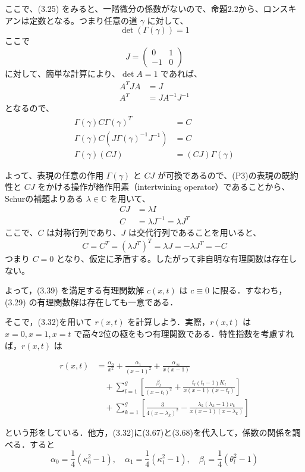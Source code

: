 \documentclass[paper=a4, fontsize=11pt]{jlreq} %
\newenvironment{story}{%
  \begin{mdframed}[
    backgroundcolor=red!5, %
    linewidth=0pt,         %
    innertopmargin=10pt,   %
    innerbottommargin=10pt,
    innerrightmargin=10pt, %
    innerleftmargin=10pt
  ]%
}{%
  \end{mdframed}%
}
\theoremstyle{break}
\theoremstyle{qa}
\begin{document}
ここで、(3.25) をみると、一階微分の係数がないので、命題2.2から、ロンスキアンは定数となる。つまり任意の道 $\gamma$ に対して、
\begin{equation*}
    \det(\Gamma(\gamma)) = 1
\end{equation*}
ここで
\begin{equation*}
    J =
    \begin{pmatrix}
        0 & 1 \\
        -1 & 0
    \end{pmatrix}
\end{equation*}
に対して、簡単な計算により、$\det A = 1$ であれば、
\begin{align*}
    A^{T}JA &= J \\
    A^{T} &= JA^{-1}J^{-1}
\end{align*}
となるので、
\begin{align*}
    \Gamma(\gamma) C \Gamma(\gamma)^{T} &= C \\
    \Gamma(\gamma) C (J\Gamma(\gamma)^{-1}J^{-1}) &= C \\
    \Gamma(\gamma) (CJ) &= (CJ)\Gamma(\gamma)
\end{align*}

よって、表現の任意の作用 $\Gamma(\gamma)$ と $CJ$ が可換であるので、(P3)の表現の既約性と $CJ$ をかける操作が絡作用素（intertwining operator）であることから、Schurの補題よりある $\lambda\in\mathbb{C}$ を用いて、
\begin{align*}
    CJ &= \lambda I \\
    C &= \lambda J^{-1} = \lambda J^{T}
\end{align*}
ここで、$C$ は対称行列であり、$J$ は交代行列であることを用いると、
\begin{equation*}
    C = C^{T} = (\lambda J^{T})^{T} = \lambda J = -\lambda J^{T} = -C
\end{equation*}
つまり $C=0$ となり、仮定に矛盾する。したがって非自明な有理関数は存在しない。

よって，(3.39) を満足する有理関数解 $c(x,t)$ は $c \equiv 0$ に限る．すなわち，(3.29) の有理関数解は存在しても一意である．
\begin{story}
そこで，(3.32)を用いて $r(x,t)$ を計算しよう．実際，$r(x,t)$ は $x=0, x=1, x=t$ で高々2位の極をもつ有理関数である．特性指数を考慮すれば，$r(x,t)$ は

\begin{align}
    r(x,t) &= \frac{\alpha_0}{x^2} + \frac{\alpha_1}{(x-1)^2} + \frac{\alpha_\infty}{x(x-1)} \nonumber \\
    &\quad + \sum_{l=1}^g \left[ \frac{\beta_l}{(x-t_l)^2} + \frac{t_l(t_l-1)K_l}{x(x-1)(x-t_l)} \right] \label{eq:3.85} \\
    &\quad + \sum_{k=1}^g \left[ \frac{3}{4(x-\lambda_k)^2} - \frac{\lambda_k(\lambda_k-1)\nu_k}{x(x-1)(x-\lambda_k)} \right] \nonumber
\end{align}

という形をしている．他方，(3.32)に(3.67)と(3.68)を代入して，係数の関係を調べる．すると
\begin{equation*}
    \alpha_0 = \frac{1}{4}(\kappa_0^2 - 1), \quad \alpha_1 = \frac{1}{4}(\kappa_1^2 - 1), \quad \beta_l = \frac{1}{4}(\theta_l^2 - 1)
\end{equation*}
\end{story}
\end{document}

